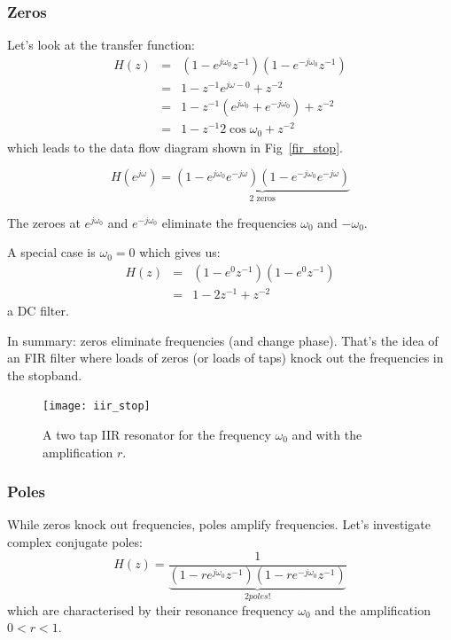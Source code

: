 \documentclass[12pt,a4paper]{article}
\begin{document}
\subsubsection{Zeros}
Let's look at the transfer function:
\begin{eqnarray}
H(z) & = & (1 - e^{j\omega_0} z^{-1})(1 - e^{-j\omega_0} z^{-1}) \\
     & = & 1 - z^{-1} e^{j \omega-{0}} + z^{-2} \\
     & = & 1 - z^{-1} (e^{j \omega_{0}} + e^{-j \omega_{0}}) + z^{-2} \\
     & = & 1 - z^{-1} 2 \cos \omega_{0} + z^{-2}
\end{eqnarray}
which leads to the data flow diagram shown in Fig~\ref{fir_stop}.

\begin{equation}
H(e^{j\omega}) = \underbrace{(1 - e^{j\omega_0}e^{-j\omega})(1 - e^{-j\omega_0} e^{-j\omega})}_{\mbox{2 zeros}}
\end{equation}

The zeroes at 
$e^{j \omega_{0}}$ and $e^{-j \omega_0}$ 
eliminate the frequencies $\omega_{0}$ and $-\omega_{0}$. 

A special case is $\omega_{0} = 0$
which gives us:
\begin{eqnarray}
H(z) & = & (1 - e^{0} z^{-1})(1 - e^{0} z^{-1}) \\
     & = & 1 - 2 z^{-1} + z^{-2}
\end{eqnarray}
a DC filter.

In summary: zeros eliminate frequencies (and change phase).
That's the idea of an FIR filter where loads of zeros (or loads of taps)
knock out the frequencies in the stopband.


\begin{figure}[!hbt]
\begin{center}
\mbox{\texttt{[image: iir\_stop]}}
\end{center}
\caption{A two tap IIR resonator for the frequency $\omega_0$ and with
the amplification $r$.
\label{iir_stop}}
\end{figure}

\subsubsection{Poles}
While zeros knock out frequencies, poles amplify frequencies.
Let's investigate complex conjugate poles:
\begin{equation}
H(z) = \frac{1}{\underbrace{(1 - r e^{j \omega_{0}} z^{-1})(1 - r e^{-j \omega_{0}} z^{-1})}_{2 poles!}} 
\label{resonatorz}
\end{equation}
which are characterised by their resonance frequency $\omega_0$
and the amplification $0<r<1$.
\end{document}
